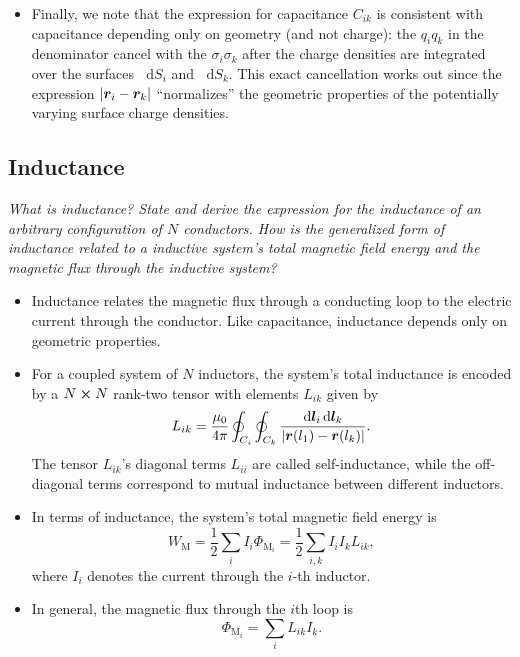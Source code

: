 \documentclass[11pt, a4paper]{article}
\newcommand{\diff}{\mathop{}\!\mathrm{d}} %
\renewcommand{\vec}[1]{\bm{#1}} %
\renewcommand{\r}{\vec{r}}
\newcommand{\mm}{\mu_{0}}  %
\begin{document}
\begin{itemize}
	\item Finally, we note that the expression for capacitance $ C_{ik} $ is consistent with capacitance depending only on geometry (and not charge): the $ q_{i}q_{k} $ in the denominator cancel with the $ \sigma_{i} \sigma_{k} $ after the charge densities are integrated over the surfaces $ \diff S_{i} $ and $ \diff S_{k} $. This exact cancellation works out since the expression $ \abs{\r_{i} - \r_{k}} $ ``normalizes'' the geometric properties of the potentially varying surface charge densities. 

	
\end{itemize}

\subsection{Inductance}

\textit{What is inductance? State and derive the expression for the inductance of an arbitrary configuration of $ N $ conductors. How is the generalized form of inductance related to a inductive system's total magnetic field energy and the magnetic flux through the inductive system?}

\begin{itemize}

	\item Inductance relates the magnetic flux through a conducting loop to the electric current through the conductor. Like capacitance, inductance depends only on geometric properties.

    \item For a coupled system of $ N $ inductors, the system's total inductance is encoded by a $ N \cross N $ rank-two tensor with elements $ L_{ik} $ given by
	\begin{equation*}
		L_{ik} = \frac{\mm}{4\pi}\oint_{C_{i}}\oint_{C_{k}}\frac{\diff \vec{l}_{i}\diff \vec{l}_{k}}{\abs{\r(l_{1}) - \r(l_{k})}}.
	\end{equation*}
    The tensor $ L_{ik} $'s diagonal terms $ L_{ii} $ are called self-inductance, while the off-diagonal terms correspond to mutual inductance between different inductors.

    \item In terms of inductance, the system's total magnetic field energy is
	\begin{equation*}
        W_{\text{M}} = \frac{1}{2}\sum_{i}I_{i}\Phi_{\text{M}_{i}} = \frac{1}{2} \sum_{i, k}I_{i}I_{k} L_{ik},
	\end{equation*}
    where $ I_{i} $ denotes the current through the $ i $-th inductor.
	
    \item In general, the magnetic flux through the $ i $th loop is
    \begin{equation*}
        \Phi_{\text{M}_{i}} = \sum_{i} L_{ik}I_{k}.
    \end{equation*}
	
\end{itemize}
\end{document}
